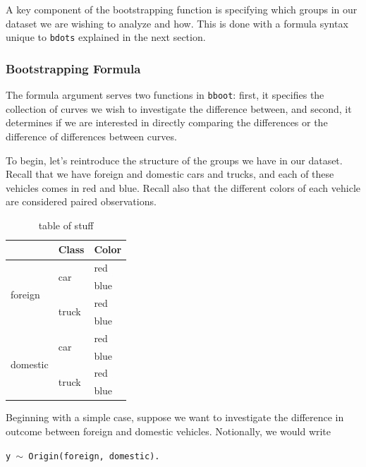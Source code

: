 \documentclass{article}
\newcommand{\xt}{\texttt}%
\begin{document}
A key component of the bootstrapping function is specifying which groups in our dataset we are wishing to analyze and how. This is done with a formula syntax unique to \xt{bdots} explained in the next section.

\subsubsection{Bootstrapping Formula}


The formula argument serves two functions in \xt{bboot}: first, it specifies the collection of curves we wish to investigate the difference between, and second, it determines if we are interested in directly comparing the differences or the difference of differences between curves. 

To begin, let's reintroduce the structure of the groups we have in our dataset. Recall that we have foreign and domestic cars and trucks, and each of these vehicles comes in red and blue. Recall also that the different colors of each vehicle are considered paired observations.

\begin{table}
\centering
\def\arraystretch{1.5}
\begin{tabular}{|p{0.9in}|p{0.9in}|p{0.9in}|} \hline 
\rowcolor{lightgray} \multicolumn{1}{|c|}{Origin} & \multicolumn{1}{c|}{Class} & \multicolumn{1}{c|}{Color}\\
\hline
\multirow{4}{*}{foreign} & \multirow{2}{*}{car} & red \\
\hhline{~~-}
& & blue \\
\hhline{~--}
& \multirow{2}{*}{truck} & red \\
\hhline{~~-}
& & blue \\
\hline
\multirow{4}{*}{domestic} & \multirow{2}{*}{car} & red \\
\hhline{~~-}
& & blue \\
\hhline{~--}
& \multirow{2}{*}{truck} & red \\
\hhline{~~-}
& & blue \\
\hline
\end{tabular}
\caption{table of stuff}
\label{tab:group_table}
\end{table}


Beginning with a simple case, suppose we want to investigate the difference in outcome between foreign and domestic vehicles. Notionally, we would write

\begin{center}
\tt y $\sim$ Origin(foreign, domestic).
\end{center}
\end{document}
